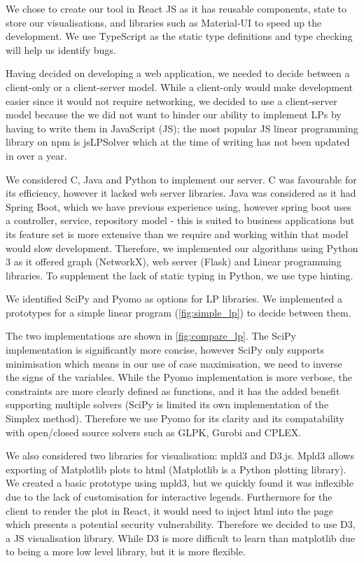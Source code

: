 We chose to create our tool in React JS as it has reusable components, state to store our visualisations, and libraries such as Material-UI to speed up the development. We use TypeScript as the static type definitions and type checking will help us identify bugs.

Having decided on developing a web application, we needed to decide between a client-only or a client-server model. While a client-only would make development easier since it would not require networking, we decided to use a client-server model because the we did not want to hinder our ability to implement LPs by having to write them in JavaScript (JS); the most popular JS linear programming library on npm is jsLPSolver which at the time of writing has not been updated in over a year.

We considered C, Java and Python to implement our server. C was favourable for its efficiency, however it lacked web server libraries. Java was considered as it had Spring Boot, which we have previous experience using, however spring boot uses a controller, service, repository model - this is suited to business applications but its feature set is more extensive than we require and working within that model would slow development. Therefore, we implemented our algorithms using Python 3 as it offered graph (NetworkX), web server (Flask) and Linear programming libraries. To supplement the lack of static typing in Python, we use type hinting.

We identified SciPy and Pyomo as options for LP libraries. We implemented a prototypes for a simple linear program (\cref{fig:simple_lp}) to decide between them.



The two implementations are shown in \cref{fig:compare_lp}. The SciPy implementation is significantly more concise, however SciPy only supports minimisation which means in our use of case maximisation, we need to inverse the signs of the variables. While the Pyomo implementation is more verbose, the constraints are more clearly defined as functions, and it has the added benefit supporting multiple solvers (SciPy is limited its own implementation of the Simplex method). Therefore we use Pyomo for its clarity and its compatability with open/closed source solvers such as GLPK, Gurobi and CPLEX.



We also considered two libraries for visualisation: mpld3 and D3.js. Mpld3 allows exporting of Matplotlib plots to html (Matplotlib is a Python plotting library). We created a basic prototype using mpld3, but we quickly found it was inflexible due to the lack of customisation for interactive legends. Furthermore for the client to render the plot in React, it would need to inject html into the page which presents a potential security vulnerability. Therefore we decided to use D3, a JS visualisation library. While D3 is more difficult to learn than matplotlib due to being a more low level library, but it is more flexible.